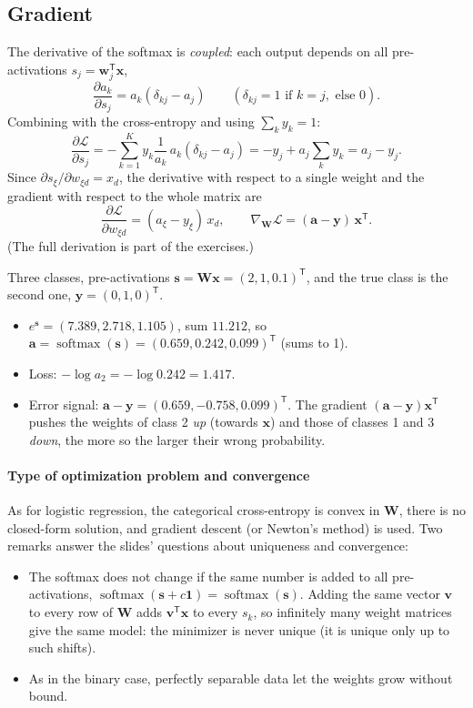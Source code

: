 \documentclass[11pt, oneside]{book}
\newcommand{\grad}{\nabla}               %
\newcommand{\pd}[2]{\frac{\partial #1}{\partial #2}}
\newcommand{\T}{^{\mathsf{T}}}           %
\newcommand{\ones}{\mathbf{1}}
\newcommand{\loss}{\mathcal{L}}          %
\newcommand{\params}{\boldsymbol{\theta}}   %
\DeclareMathOperator{\softmax}{softmax}
\newcommand{\bx}{\bm{x}}        \newcommand{\by}{\bm{y}}
\newcommand{\bw}{\bm{w}}        \newcommand{\bW}{\bm{W}}
\newcommand{\ba}{\bm{a}}        \newcommand{\bs}{\bm{s}}
\let\originalsubsection\subsection
\renewcommand{\subsection}{\Needspace{6\baselineskip}\originalsubsection}
\begin{document}
\subsection{Gradient}

The derivative of the softmax is \emph{coupled}: each output depends on all
pre-activations $s_j = \bw_j\T\bx$,
\[
  \pd{a_k}{s_j} = a_k(\delta_{kj} - a_j)
  \qquad (\delta_{kj} = 1 \text{ if } k = j, \text{ else } 0).
\]
Combining with the cross-entropy and using $\sum_k y_k = 1$:
\[
  \pd{\loss}{s_j} = -\sum_{k=1}^K y_k \frac{1}{a_k}\,a_k(\delta_{kj} - a_j)
  = -y_j + a_j\sum_{k} y_k = a_j - y_j .
\]
Since $\partial s_\xi / \partial w_{\xi d} = x_d$, the derivative with
respect to a single weight and the gradient with respect to the whole
matrix are
\[
  \pd{\loss}{w_{\xi d}} = (a_\xi - y_\xi)\,x_d,
  \qquad
  \grad_{\bW}\loss = (\ba - \by)\,\bx\T .
\]
(The full derivation is part of the exercises.)

\begin{exbox}[title={Softmax and cross-entropy with numbers}]
Three classes, pre-activations $\bs = \bW\bx = (2, 1, 0.1)\T$, and the true
class is the second one, $\by = (0, 1, 0)\T$.
\begin{itemize}
  \item $e^{\bs} = (7.389, 2.718, 1.105)$, sum $11.212$, so
    $\ba = \softmax(\bs) = (0.659, 0.242, 0.099)\T$ (sums to 1).
  \item Loss: $-\log a_2 = -\log 0.242 = 1.417$.
  \item Error signal: $\ba - \by = (0.659, -0.758, 0.099)\T$. The gradient
    $(\ba - \by)\bx\T$ pushes the weights of class 2 \emph{up} (towards $\bx$)
    and those of classes 1 and 3 \emph{down}, the more so the larger their
    wrong probability.
\end{itemize}
\end{exbox}

\paragraph{Type of optimization problem and convergence}
As for logistic regression, the categorical cross-entropy is convex in
$\bW$, there is no closed-form solution, and gradient descent (or Newton's
method) is used. Two remarks answer the slides' questions about uniqueness
and convergence:
\begin{itemize}
  \item The softmax does not change if the same number is added to all
    pre-activations, $\softmax(\bs + c\ones) = \softmax(\bs)$. Adding the same
    vector $\bm{v}$ to every row of $\bW$ adds $\bm{v}\T\bx$ to every $s_k$,
    so infinitely many weight matrices give the same model: the minimizer is
    never unique (it is unique only up to such shifts).
  \item As in the binary case, perfectly separable data let the weights grow
    without bound.
\end{itemize}
\end{document}
